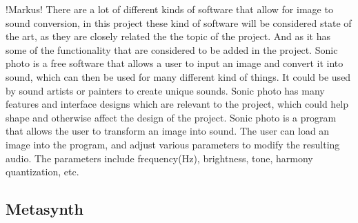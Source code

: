 !Markus!
There are a lot of different kinds of software that allow for image to sound conversion, in this project these kind of software will be considered state of the art, as they are closely related the the topic of the project. And as it has some of the functionality that are considered to be added in the project.
Sonic photo is a free software that allows a user to input an image and convert it into sound, which can then be used for many different kind of things. It could be used by sound artists or painters to create unique sounds.
Sonic photo has many features and interface designs which are relevant to the project, which could help shape and otherwise affect the design of the project.
Sonic photo is a program that allows the user to transform an image into sound. The user can load an image into the program, and adjust various parameters to modify the resulting audio. The parameters include  frequency(Hz), brightness, tone, harmony quantization, etc.


\subsection{Metasynth}\label{sub:metasynth}
